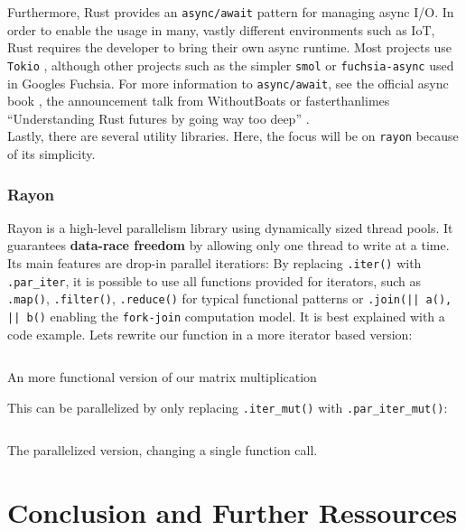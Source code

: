 Furthermore, Rust provides an \texttt{async/await} pattern for managing async \ac{I/O}. In order to enable the usage in many, vastly different environments such as \ac{IoT}, Rust requires the developer to bring their own async runtime. Most projects use \texttt{Tokio} \cite{tokio}, although other projects such as the simpler \texttt{smol} or \texttt{fuchsia-async} \cite{fuchsia} used in Googles Fuchsia. For more information to \texttt{async/await}, see the official async book \cite{asyncbook}, the announcement talk from WithoutBoats \cite{withoutboats} or fasterthanlimes ``Understanding Rust futures by going way too deep'' \cite{fasterthanlime}.\\

Lastly, there are several utility libraries. Here, the focus will be on \texttt{rayon} because of its simplicity.

\subsubsection{Rayon}

Rayon is a high-level parallelism library using dynamically sized thread pools. It guarantees \textbf{data-race freedom} by allowing only one thread to write at a time. Its main features are drop-in parallel iteratiors: By replacing \texttt{.iter()} with \texttt{.par\_iter}, it is possible to use all functions provided for iterators, such as \texttt{.map()}, \texttt{.filter()}, \texttt{.reduce()} for typical functional patterns or \texttt{.join(|| a(), || b()} enabling the \texttt{fork-join} computation model.
It is best explained with a code example. Lets rewrite our function in a more iterator based version:

\begin{listing}[H]
  \inputminted{rust}{./assets/02rayon.rs}
\caption{An more functional version of our matrix multiplication}
\end{listing}

This can be parallelized by only replacing \texttt{.iter\_mut()} with \texttt{.par\_iter\_mut()}:

\begin{listing}[H]
  \inputminted{rust}{./assets/03rayon.rs}
\caption{The parallelized version, changing a single function call.}
\end{listing}

\section{Conclusion and Further Ressources}

